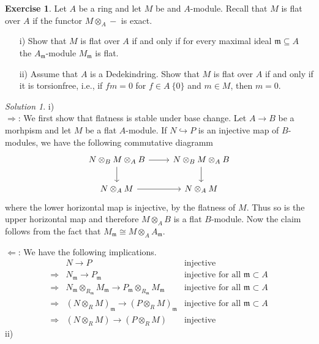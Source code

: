 \documentclass[10pt]{article}
\author{Janos }
\theoremstyle{definition}
\newtheorem{exercise}{Exercise}
\theoremstyle{remark}
\newtheorem*{solution}{Solution}
\begin{document}
\setcounter{exercise}{0}
\begin{exercise}
Let $A$ be a ring and let $M$ be and $A$-module. Recall that $M$ is flat over $A$ if the functor $ M\otimes_A -$ is exact.
\begin{enumerate}
\item[i)] Show that $M$ is flat over $A$ if and only if for every maximal ideal $\mathfrak{m} \subseteq A$ the $A_{\mathfrak{m}}$-module $M_{\mathfrak{m}}$ is flat.
\item[ii)] Assume that $A$ is a Dedekindring. Show that $M$ is flat over $A$ if and only if it is torsionfree, i.e., if $fm=0$ for $f \in A \ \{0\}$ and $m \in M$, then $m =0$.
\end{enumerate}
\end{exercise}
\begin{solution}
i) \\

$\Rightarrow$: We first show that flatness is stable under base change. Let $A \rightarrow B$ be a morhpism and let $M$ be a flat $A$-module. If $ N \hookrightarrow P$ is an injective map of $B$-modules, we have the following commutative diagramm
\[
  \begin{tikzcd}
    N \otimes_B M \otimes_A B \arrow{r}{} \arrow[d] & N \otimes_B M \otimes_A B \arrow{d} \\
      N \otimes_A M \arrow{r}{} & N \otimes_A M
  \end{tikzcd}
\]
where the lower horizontal map is injective, by the flatness of $M$. Thus so is the upper horizontal map and therefore $M \otimes_A B$ is a flat $B$-module. Now the claim follows from the fact that $M_{\mathfrak{m}} \cong M \otimes_A A_{\mathfrak{m}}$.

$\Leftarrow$: We have the following implications.
\begin{align*}
&N \rightarrow P &\text{injective} \\
\Rightarrow &N_{\mathfrak{m}} \rightarrow P_{\mathfrak{m}} &\text{injective for all }\mathfrak{m}\subset A\\
\Rightarrow &N_{\mathfrak{m}} \otimes_{R_{\mathfrak{m}}} M_{\mathfrak{m}} \rightarrow P_{\mathfrak{m}}\otimes_{R_{\mathfrak{m}}} M_{\mathfrak{m}} &\text{injective for all }\mathfrak{m}\subset A\\
\Rightarrow &(N \otimes_{R} M)_{\mathfrak{m}} \rightarrow (P \otimes_{R} M)_{\mathfrak{m}} &\text{injective for all }\mathfrak{m}\subset A\\
\Rightarrow &(N \otimes_{R} M)\rightarrow (P \otimes_{R} M) &\text{injective}
\end{align*}
ii)\\


\end{solution}
\end{document}
